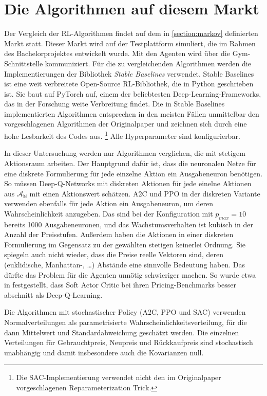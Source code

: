\section{Die Algorithmen auf diesem Markt}
Der Vergleich der RL-Algorithmen findet auf dem in \ref{section:markov} definierten Markt statt.
Dieser Markt wird auf der Testplattform simuliert, die im Rahmen des Bachelorprojektes entwickelt wurde.
Mit den Agenten wird über die Gym-Schnittstelle \cite{brockman2016openai} kommuniziert.
Für die zu vergleichenden Algorithmen werden die Implementierungen der Bibliothek \textit{Stable Baselines} \cite{stable-baselines} verwendet.
Stable Baselines ist eine weit verbreitete Open-Source RL-Bibliothek, die in Python geschrieben ist.
Sie baut auf PyTorch \cite{NEURIPS2019_9015} auf, einem der beliebtesten Deep-Learning-Frameworks, das in der Forschung weite Verbreitung findet.
Die in Stable Baselines implementierten Algorithmen entsprechen in den meisten Fällen unmittelbar den vorgeschlagenen Algorithmen der Originalpaper und zeichnen sich durch eine hohe Lesbarkeit des Codes aus. \footnote{Die SAC-Implementierung verwendet nicht den im Originalpaper vorgeschlagenen Reparameterization Trick.}
Alle Hyperparameter sind konfigurierbar.

In dieser Untersuchung werden nur Algorithmen verglichen, die mit stetigem Aktionsraum arbeiten.
Der Hauptgrund dafür ist, dass die neuronalen Netze für eine diskrete Formulierung für jede einzelne Aktion ein Ausgabeneuron benötigen.
So müssen Deep-Q-Networks mit diskreten Aktionen für jede einelne Aktionen aus $\mathcal{A_\mathbb{N}}$ mit einen Aktionswert schätzen.
A2C und PPO in der diskreten Variante verwenden ebenfalls für jede Aktion ein Ausgabeneuron, um deren Wahrscheinlichkeit anzugeben.
Das sind bei der Konfiguration mit $p_{max}=10$ bereits 1000 Ausgabeneuronen, und das Wachstumsverhalten ist kubisch in der Anzahl der Preisstufen.
Außerdem haben die Aktionen in einer diskreten Formulierung im Gegensatz zu der gewählten stetigen keinerlei Ordnung.
Sie spiegeln auch nicht wieder, dass die Preise reelle Vektoren sind, deren (euklidische, Manhattan-, \dots) Abstände eine sinnvolle Bedeutung haben.
Das dürfte das Problem für die Agenten unnötig schwieriger machen.
So wurde etwa in \cite{Kastius2022} festgestellt, dass Soft Actor Critic bei ihren Pricing-Benchmarks besser abschnitt als Deep-Q-Learning.

Die Algorithmen mit stochastischer Policy (A2C, PPO und SAC) verwenden Normalverteilungen als parametrisierte Wahrscheinlichkeitsverteilung, für die dann Mittelwert und Standardabweichung geschätzt werden.
Die einzelnen Verteilungen für Gebrauchtpreis, Neupreis und Rückkaufpreis sind stochastisch unabhängig und damit insbesondere auch die Kovarianzen null.

